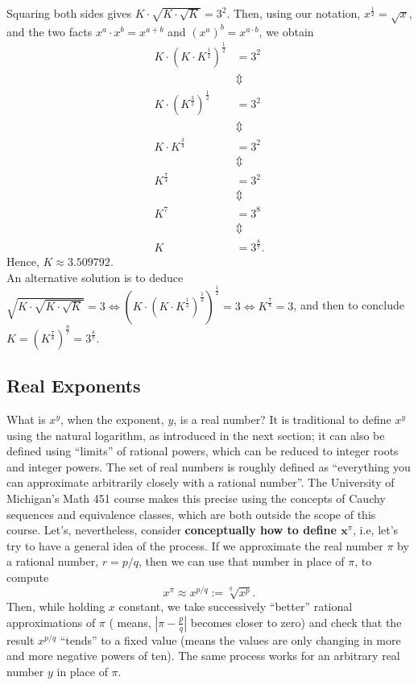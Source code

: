 Squaring both sides gives $ K \cdot \sqrt{ K \cdot \sqrt{K}}   = 3^2$. Then, using our notation, $x^\frac{1}{2} = \sqrt{x}$, and the two facts $x^a \cdot x^b = x^{a + b}$ and $\left(x^a \right)^b = x^{a \cdot b}$, we obtain
\begin{align*}
K \cdot \left( K \cdot K^\frac{1}{2} \right)^ \frac{1}{2}  &= 3^2 \\
    & \Updownarrow \\
    K \cdot \left( K^\frac{3}{2} \right)^ \frac{1}{2}  &= 3^2 \\
      & \Updownarrow \\
    K \cdot K^\frac{3}{4} &= 3^2 \\
          & \Updownarrow \\
K^\frac{7}{4} &= 3^2 \\   
          & \Updownarrow \\
K^7 &= 3^8 \\ 
          & \Updownarrow \\
K &= 3^\frac{8}{7}.  
\end{align*}
Hence, $K\approx 3.509792$.\\

An alternative solution is to deduce $ \sqrt{K \cdot \sqrt{K \cdot \sqrt{K} } } = 3 \iff \left(K \cdot \left( K \cdot K^\frac{1}{2} \right)^ \frac{1}{2} \right)^\frac{1}{2} = 3  \iff K^\frac{7}{8} = 3$, and then to conclude $K= \left(K^\frac{7}{8} \right)^\frac{8}{7} = 3^\frac{8}{7}$.
\Qed

\subsection{Real Exponents}

What is $x^y$, when the exponent, $y$, is a real number? It is traditional to define $x^y$ using the natural logarithm, as introduced in the next section; it can also be defined using ``limits'' of rational powers, which can be reduced to integer roots and integer powers. The set of real numbers is roughly defined as ``everything you can approximate arbitrarily closely with a rational number''. The University of Michigan's Math 451 course makes this precise using the concepts of Cauchy sequences and equivalence classes, which are both outside the scope of this course. Let's, nevertheless, consider \textbf{conceptually how to define $\mathbf x^\pi$}, i.e, let's try to have a general idea of the process. If we approximate the real number $\pi$ by a rational number, $r=p/q$, then we can use that number in place of $\pi$, to compute 
 $$x^\pi \approx x^{p/q}:= \sqrt[q]{x^p}.$$
 Then, while holding $x$ constant, we take successively ``better'' rational approximations of $\pi$ ( means, $|\pi - \frac{p}{q}|$ becomes closer to zero) and check that the result $x^{p/q}$ ``tends'' to a fixed value (means the values are only changing in more and more negative powers of ten). The same process works for an arbitrary real number $y$ in place of $\pi$. 

